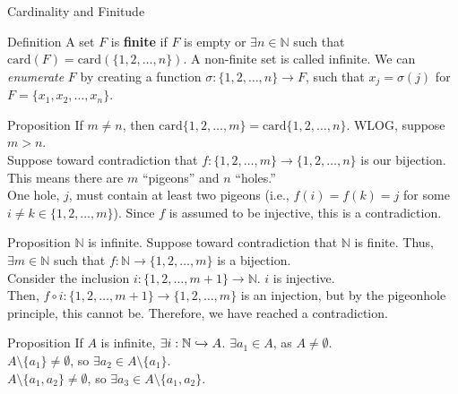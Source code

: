 \documentclass[10pt]{extarticle}
\begin{document}
\begin{problem}{Cardinality and Finitude}
\begin{problem}{Definition}
      A set $F$ is \textbf{finite} if $F$ is empty or $\exists n\in \mathbb{N}$ such that $\textrm{card}(F) = \textrm{card}\left(\{1,2,\dots,n\}\right)$. A non-finite set is called infinite.
      \tcblower
      We can \textit{enumerate} $F$ by creating a function $\sigma: \{1,2,\dots,n\}\rightarrow F$, such that $x_j = \sigma(j)$ for $F = \{x_1,x_2,\dots,x_n\}$.
    \end{problem}
    \begin{problem}{Proposition}
      If $m\neq n$, then $\textrm{card}\{1,2,\dots,m\} = \textrm{card}\{1,2,\dots,n\}$.
      \tcblower
      WLOG, suppose $m>n$.\\

      Suppose toward contradiction that $f: \{1,2,\dots,m\} \rightarrow \{1,2,\dots,n\}$ is our bijection. This means there are $m$ ``pigeons'' and $n$ ``holes.''\\

      One hole, $j$, must contain at least two pigeons (i.e., $f(i) = f(k) = j$ for some $i\neq k\in \{1,2,\dots,m\}$). Since $f$ is assumed to be injective, this is a contradiction.
    \end{problem}
    \begin{problem}{Proposition}
      $\mathbb{N}$ is infinite.
      \tcblower
      Suppose toward contradiction that $\mathbb{N}$ is finite. Thus, $\exists m\in \mathbb{N}$ such that $f:\mathbb{N} \rightarrow \{1,2,\dots,m\}$ is a bijection.\\

      Consider the inclusion $i: \{1,2,\dots,m+1\}\rightarrow \mathbb{N}$. $i$ is injective.\\

      Then, $f\circ i: \{1,2,\dots,m+1\} \rightarrow \{1,2,\dots,m\}$ is an injection, but by the pigeonhole principle, this cannot be. Therefore, we have reached a contradiction.
    \end{problem}
    \begin{problem}{Proposition}
      If $A$ is infinite, $\exists i: \mathbb{N} \xhookrightarrow{} A$.
      \tcblower
      $\exists a_1\in A$, as $A\neq \emptyset$.\\

      $A\setminus \{a_1\} \neq \emptyset$, so $\exists a_2 \in A\setminus \{a_1\}$.\\

      $A \setminus \{a_1,a_2\} \neq \emptyset$, so $\exists a_3\in A\setminus \{a_1,a_2\}$.\\


\end{problem}
\end{problem}
\end{document}

